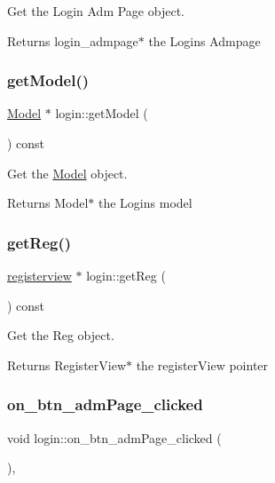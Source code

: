 Get the Login Adm Page object. 

\begin{DoxyReturn}{Returns}
login\+\_\+admpage$\ast$ the Login\textquotesingle{}s Admpage 
\end{DoxyReturn}
\mbox{\label{classlogin_a39618a46d937fed5e8d29c652a08ba8d}} 
\subsubsection{\texorpdfstring{get\+Model()}{getModel()}}
{\footnotesize\ttfamily \hyperlink{classModel}{Model} $\ast$ login\+::get\+Model (\begin{DoxyParamCaption}{ }\end{DoxyParamCaption}) const}



Get the \hyperlink{classModel}{Model} object. 

\begin{DoxyReturn}{Returns}
Model$\ast$ the Login\textquotesingle{}s model 
\end{DoxyReturn}
\mbox{\label{classlogin_a4a6b52d07ff54425b77eeb2625c413e7}} 
\subsubsection{\texorpdfstring{get\+Reg()}{getReg()}}
{\footnotesize\ttfamily \hyperlink{classregisterview}{registerview} $\ast$ login\+::get\+Reg (\begin{DoxyParamCaption}{ }\end{DoxyParamCaption}) const}



Get the Reg object. 

\begin{DoxyReturn}{Returns}
Register\+View$\ast$ the register\+View pointer 
\end{DoxyReturn}
\mbox{\label{classlogin_afd45d9eb7e10b36d5b40f598de3fa2c8}} 
\subsubsection{\texorpdfstring{on\+\_\+btn\+\_\+adm\+Page\+\_\+clicked}{on\_btn\_admPage\_clicked}}
{\footnotesize\ttfamily void login\+::on\+\_\+btn\+\_\+adm\+Page\+\_\+clicked (\begin{DoxyParamCaption}{ }\end{DoxyParamCaption})\hspace{0.3cm}{\ttfamily [private]}, {\ttfamily [slot]}}




